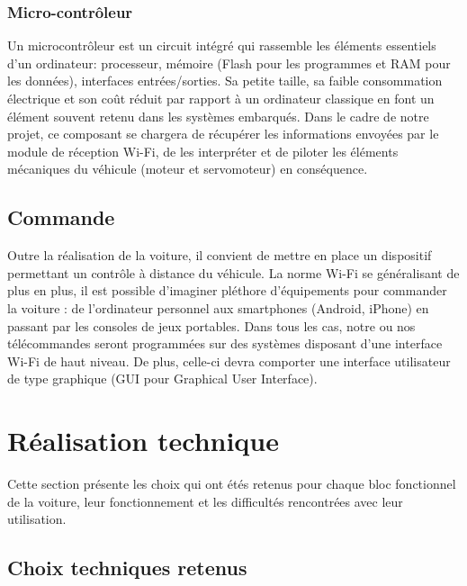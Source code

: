 \documentclass[a4paper,12pt]{report}
\begin{document}
			\subsubsection{Micro-contrôleur}
			Un microcontrôleur est un circuit intégré qui rassemble les éléments essentiels d’un ordinateur: processeur, mémoire (Flash pour les programmes et RAM pour les données), interfaces entrées/sorties. Sa petite taille, sa faible consommation électrique et son coût réduit par rapport à un ordinateur classique en font un élément souvent retenu dans les systèmes embarqués.
Dans le cadre de notre projet, ce composant se chargera de récupérer les informations envoyées par le module de réception Wi-Fi, de les interpréter et de piloter les éléments mécaniques du véhicule (moteur et servomoteur) en conséquence.
			
		\subsection{Commande}
		Outre la réalisation de la voiture, il convient de mettre en place un dispositif permettant un contrôle à distance du véhicule. La norme Wi-Fi se généralisant de plus en plus, il est possible d’imaginer pléthore d’équipements pour commander la voiture : de l’ordinateur personnel aux smartphones (Android, iPhone)  en passant par les consoles de jeux portables.
Dans tous les cas, notre ou nos télécommandes seront programmées sur des systèmes disposant d’une interface Wi-Fi de haut niveau. De plus, celle-ci devra comporter une interface utilisateur de type graphique (GUI pour Graphical User Interface).
		
	\section{Réalisation technique}
	Cette section présente les choix qui ont étés retenus pour chaque bloc fonctionnel de la voiture, leur fonctionnement et les difficultés rencontrées avec leur utilisation.
	
		\subsection{Choix techniques retenus}
		
\end{document}
